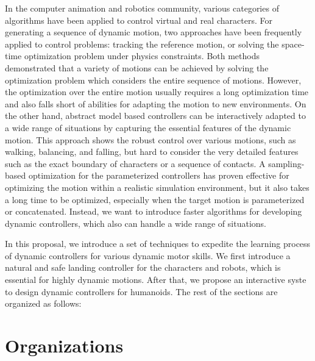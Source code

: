 In the computer animation and robotics community, various categories
of algorithms have been applied to control virtual and real characters.
For generating a sequence of dynamic motion, two approaches have been
frequently applied to control problems: tracking the reference motion, or 
solving the space-time optimization problem under physics constraints.
Both methods demonstrated that a variety of motions can be achieved 
by solving the optimization problem which considers the entire sequence
of motions.
However, the optimization over the entire motion usually requires
a long optimization time and also falls short of abilities
for adapting the motion to new environments.
On the other hand, abstract model based controllers can be interactively
adapted to a wide range of situations by capturing the essential features
of the dynamic motion.
This approach shows the robust control over various motions,
such as walking, balancing, and falling, but hard to consider the
very detailed features such as the exact boundary of characters 
or a sequence of contacts.
A sampling-based optimization for the parameterized controllers has proven
effective for optimizing the motion within a realistic simulation environment,
but it also takes a long time to be optimized, especially when the target
motion is parameterized or concatenated.
Instead, we want to introduce faster algorithms for developing
dynamic controllers, which also can handle a wide range of situations.

In this proposal, we introduce a set of techniques to expedite
the learning process of dynamic controllers for various dynamic motor 
skills. We first introduce a natural and safe landing controller for
the characters and robots, which is essential for highly dynamic motions.
After that, we propose an interactive syste to design dynamic controllers
for humanoids. The rest of the sections are organized as follows:

\section{Organizations}

